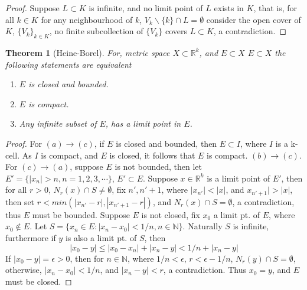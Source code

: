 \documentclass{amsart}
\numberwithin{equation}{section}
\theoremstyle{plain}
\newtheorem{thm}{Theorem}[section]
\theoremstyle{definition}
\begin{document}
\begin{proof}
  Suppose $L \subset K$ is infinite, and no limit point of $L$ exists in $K$, that is, for all $k \in K$ for any neighbourhood of $k$, $V_k \backslash \{k\} \cap L = \emptyset$ 
  consider the open cover of $K$, $\{V_k\}_{k \in K}$, no finite subcollection of $\{V_k\}$ covers $L \subset K$, a contradiction.
\end{proof}
\begin{thm}[Heine-Borel]
  For, metric space $X \subset \mathbb{R}^k$, and $E \subset X$ $E \subset X$ the following statements are equivalent
  \begin{enumerate}
    \item[(a)] $E$ is closed and bounded. \\
    \item[(b)] $E$ is compact. \\
    \item[(c)] Any infinite subset of $E$, has a limit point in $E$.
  \end{enumerate}
\end{thm}
\begin{proof}
  For $(a) \rightarrow (c)$, if $E$ is closed and bounded, then $E \subset I$, where $I$ is a k-cell. 
  As $I$ is compact, and $E$ is closed, it follows that $E$ is compact. $(b) \rightarrow (c)$. For $(c) \rightarrow (a)$, 
  suppose $E$ is not bounded, then let $E' = \{|x_n| > n, n = 1,2,3,\cdots\}$, $E' \subset E$. Suppose $x \in \mathbb{R}^k$ is a limit point of $E'$, then
  for all $r > 0$, $N_r(x) \cap S \not= \emptyset$, fix $n', n' + 1$, where $|x_{n'}| < |x|$, and $x_{n' + 1}| > |x|$, then set
  $r < min(|x_{n'} -r|, |x_{n' + 1} - r|)$, and $N_r(x) \cap S = \emptyset$, a contradiction, thus $E$ must be bounded.
  Suppose $E$ is not closed, fix $x_0$ a limit pt. of $E$, where $x_0 \not\in E$. Let $S = \{x_n \in E: |x_n - x_0| < 1/n, n \in \mathbb{N}\}$.
  Naturally $S$ is infinite, furthermore if $y$ is also a limit pt. of $S$, then
  \begin{equation}
    |x_0 - y| \leq |x_0 - x_n| + |x_n - y| < 1/n + |x_n - y|
  \end{equation}
  If $|x_0 - y| = \epsilon > 0$, then for $n \in \mathbb{N}$, where $1/n < \epsilon$, $r < \epsilon - 1/n$, $N_r(y) \cap S = \emptyset$, otherwise,
  $|x_n - x_0| < 1/n$, and $|x_n - y| < r$, a contradiction. Thus $x_0 = y$, and $E$ must be closed. 
\end{proof}
\end{document}
